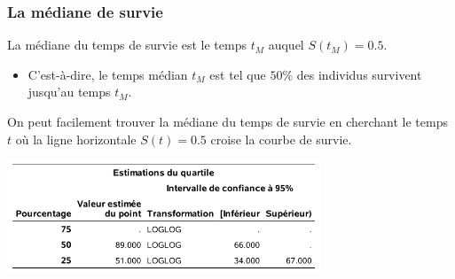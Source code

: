 \documentclass{beamer}
\begin{document}
\begin{frame}[fragile]
\frametitle{La médiane de survie}
 La médiane du temps de survie est le temps $t_M$ auquel $S(t_M)=0.5$. 
\begin{itemize}
 \item C'est-à-dire, le temps médian $t_M$ est tel que $50\%$ des individus survivent jusqu'au temps $t_M$. 
\end{itemize}
 On peut facilement trouver la médiane du temps de survie en cherchant le temps $t$ o\`u la ligne horizontale $S(t) = 0.5$ croise la courbe de survie. 
\begin{center}
\includegraphics[width = 0.7\textwidth]{img/c7/diapos7e07}
\end{center}

\end{frame}

%   
\end{document}
